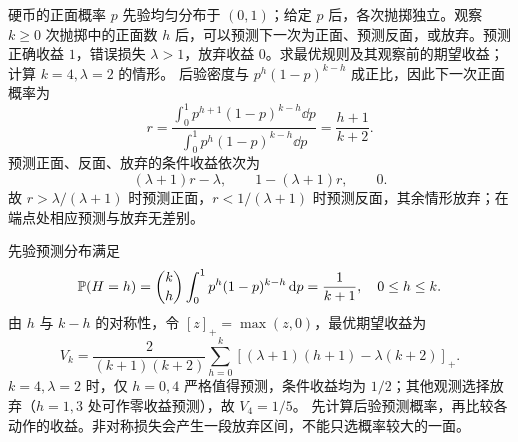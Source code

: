 硬币的正面概率 $p$ 先验均匀分布于 $(0,1)$；给定 $p$ 后，各次抛掷独立。观察 $k\ge0$ 次抛掷中的正面数 $h$ 后，可以预测下一次为正面、预测反面，或放弃。预测正确收益 $1$，错误损失 $\lambda>1$，放弃收益 $0$。求最优规则及其观察前的期望收益；计算 $k=4,\lambda=2$ 的情形。
\solution 后验密度与 $p^h(1-p)^{k-h}$ 成正比，因此下一次正面概率为
\[
r=\frac{\int_0^1p^{h+1}(1-p)^{k-h}\dd p}
{\int_0^1p^h(1-p)^{k-h}\dd p}
=\frac{h+1}{k+2}.
\]
预测正面、反面、放弃的条件收益依次为
\[
(\lambda+1)r-\lambda,\qquad 1-(\lambda+1)r,\qquad0.
\]
故 $r>\lambda/(\lambda+1)$ 时预测正面，$r<1/(\lambda+1)$ 时预测反面，其余情形放弃；在端点处相应预测与放弃无差别。

先验预测分布满足
\[
\mathbb{P}(H=h)=\binom kh\int_0^1p^h(1-p)^{k-h}\,\mathrm{d} p
=\frac1{k+1},\quad 0\le h\le k.
\]
由 $h$ 与 $k-h$ 的对称性，令 $[z]_+=\max(z,0)$，最优期望收益为
\[
\boxed{V_k=\frac{2}{(k+1)(k+2)}
\sum_{h=0}^k[(\lambda+1)(h+1)-\lambda(k+2)]_+.}
\]
$k=4,\lambda=2$ 时，仅 $h=0,4$ 严格值得预测，条件收益均为 $1/2$；其他观测选择放弃（$h=1,3$ 处可作零收益预测），故 $V_4=1/5$。
\insight 先计算后验预测概率，再比较各动作的收益。非对称损失会产生一段放弃区间，不能只选概率较大的一面。
